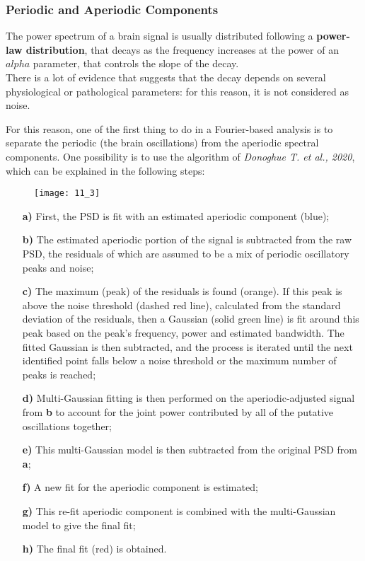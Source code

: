 \subsubsection{Periodic and Aperiodic Components}
The power spectrum of a brain signal is usually distributed following a \textbf{power-law distribution}, that decays as the frequency increases at the power of an \(alpha\) parameter, 
that controls the slope of the decay.\\
There is a lot of evidence that suggests that the decay depends on several physiological or pathological parameters: for this reason, it is not considered as noise.
\par\medskip
For this reason, one of the first thing to do in a Fourier-based analysis is to separate the periodic (the brain oscillations) from the aperiodic spectral components. One possibility is to use the algorithm 
of \textit{Donoghue T. et al., 2020}, which can be explained in the following steps:
\begin{figure}[H]
    \texttt{[image: 11\_3]}
    \centering
\end{figure}
\begin{itemize}
    \item[\textbf{a)}] First, the PSD is fit with an estimated aperiodic component (blue);
    \item[\textbf{b)}] The estimated aperiodic portion of the signal is subtracted from the raw PSD, the residuals of which are assumed to be a mix of periodic oscillatory peaks and noise;
    \item[\textbf{c)}] The maximum (peak) of the residuals is found (orange). If this peak is above the noise threshold (dashed red line), calculated from the standard deviation of the residuals, 
    then a Gaussian (solid green line) is fit around this peak based on the peak's frequency, power and estimated bandwidth. The fitted Gaussian is then subtracted, and the process 
    is iterated until the next identified point falls below a noise threshold or the maximum number of peaks is reached;
    \item[\textbf{d)}] Multi-Gaussian fitting is then performed on the aperiodic-adjusted signal from \textbf{b} to account for the joint power contributed by all of the putative oscillations together;
    \item[\textbf{e)}] This multi-Gaussian model is then subtracted from the original PSD from \textbf{a};
    \item[\textbf{f)}] A new fit for the aperiodic component is estimated;
    \item[\textbf{g)}] This re-fit aperiodic component is combined with the multi-Gaussian model to give the final fit;
    \item[\textbf{h)}] The final fit (red) is obtained.
\end{itemize}
